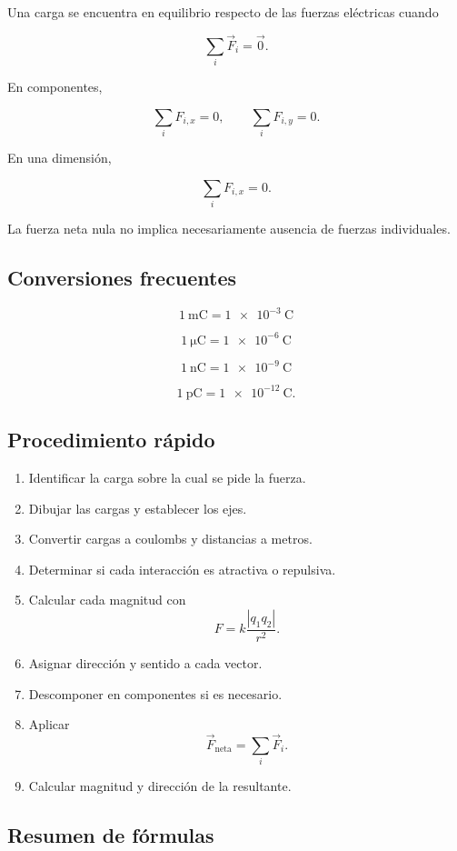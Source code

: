 Una carga se encuentra en equilibrio respecto de las fuerzas eléctricas cuando

\[
\boxed{\sum_i\vec F_i=\vec 0}.
\]

En componentes,

\[
\boxed{\sum_iF_{i,x}=0},
\qquad
\boxed{\sum_iF_{i,y}=0}.
\]

En una dimensión,

\[
\boxed{\sum_iF_{i,x}=0}.
\]

La fuerza neta nula no implica necesariamente ausencia de fuerzas individuales.


\subsection{Conversiones frecuentes}

\[
\boxed{\SI{1}{\milli\coulomb}=\SI{1e-3}{\coulomb}}
\]

\[
\boxed{\SI{1}{\micro\coulomb}=\SI{1e-6}{\coulomb}}
\]

\[
\boxed{\SI{1}{\nano\coulomb}=\SI{1e-9}{\coulomb}}
\]

\[
\boxed{\SI{1}{\pico\coulomb}=\SI{1e-12}{\coulomb}}.
\]


\subsection{Procedimiento rápido}

\begin{enumerate}
    \item Identificar la carga sobre la cual se pide la fuerza.
    \item Dibujar las cargas y establecer los ejes.
    \item Convertir cargas a coulombs y distancias a metros.
    \item Determinar si cada interacción es atractiva o repulsiva.
    \item Calcular cada magnitud con
    \[
    F=k\frac{|q_1q_2|}{r^2}.
    \]
    \item Asignar dirección y sentido a cada vector.
    \item Descomponer en componentes si es necesario.
    \item Aplicar
    \[
    \vec F_{\text{neta}}=\sum_i\vec F_i.
    \]
    \item Calcular magnitud y dirección de la resultante.
\end{enumerate}


\subsection{Resumen de fórmulas}

